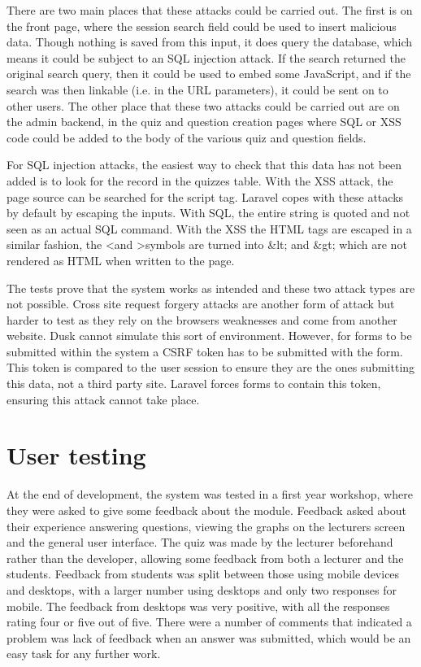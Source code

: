 There are two main places that these attacks could be carried out. The first is on the front page, where the session search field could be used to insert malicious data. Though nothing is saved from this input, it does query the database, which means it could be subject to an SQL injection attack. If the search returned the original search query, then it could be used to embed some JavaScript, and if the search was then linkable (i.e. in the URL parameters), it could be sent on to other users. The other place that these two attacks could be carried out are on the admin backend, in the quiz and question creation pages where SQL or XSS code could be added to the body of the various quiz and question fields.

For SQL injection attacks, the easiest way to check that this data has not been added is to look for the record in the quizzes table. With the XSS attack, the page source can be searched for the script tag. Laravel copes with these attacks by default by escaping the inputs\cite{laravel-web-attacks}. With SQL, the entire string is quoted and not seen as an actual SQL command. With the XSS the HTML tags are escaped in a similar fashion, the \textless and \textgreater symbols are turned into \&lt; and \&gt; which are not rendered as HTML when written to the page\cite{laravel-web-attacks}.

The tests prove that the system works as intended and these two attack types are not possible. Cross site request forgery attacks are another form of attack but harder to test as they rely on the browsers weaknesses and come from another website. Dusk cannot simulate this sort of environment. However, for forms to be submitted within the system a CSRF token has to be submitted with the form. This token is compared to the user session to ensure they are the ones submitting this data, not a third party site. Laravel forces forms to contain this token, ensuring this attack cannot take place. 

\section{User testing}
At the end of development, the system was tested in a first year workshop, where they were asked to give some feedback about the module. Feedback asked about their experience answering questions, viewing the graphs on the lecturers screen and the general user interface. The quiz was made by the lecturer beforehand rather than the developer, allowing some feedback from both a lecturer and the students. Feedback from students was split between those using mobile devices and desktops, with a larger number using desktops and only two responses for mobile. The feedback from desktops was very positive, with all the responses rating four or five out of five. There were a number of comments that indicated a problem was lack of feedback when an answer was submitted, which would be an easy task for any further work.


